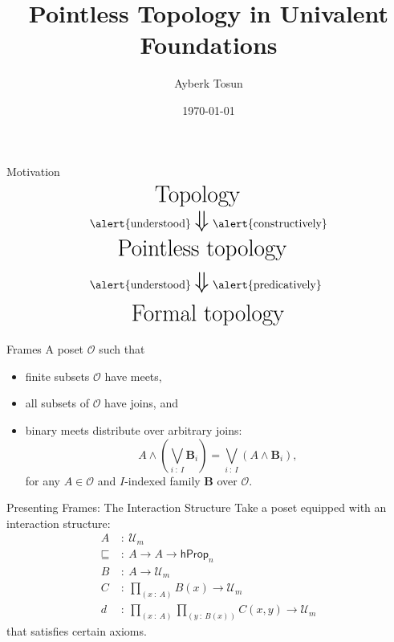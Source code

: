 \documentclass{beamer}
\title{Pointless Topology in Univalent Foundations}
\date{\today}
\author{Ayberk Tosun}
\institute{Chalmers University of Technology}
\newcommand{\pity}[3]{\prod_{(#1~:~#2)} #3}
\newcommand{\univ}{\mathcal{U}}
\begin{document}
\maketitle

\begin{frame}{Motivation}
  \begin{align*}
    \text{{\huge Top}}&\text{{\huge ology}}\\
    \text{\alert{understood}} &~\text{\huge $\Downarrow$}~\text{\alert{constructively}} \\
    \text{{\huge Pointles}}&\text{{\huge s~topology}}\\
    \text{\alert{understood}} &~\text{\huge $\Downarrow$}~\text{\alert{predicatively}} \\
    \text{{\huge Forma}}&\text{{\huge l~topology}}\\
  \end{align*}
\end{frame}

\begin{frame}{Frames}
  A poset $\mathcal{O}$ such that
  \begin{itemize}
    \item \alert{finite subsets} $\mathcal{O}$ have \alert{meets},
    \item \alert{all subsets} of $\mathcal{O}$ have \alert{joins}, and
    \item binary meets distribute over arbitrary joins:
      \begin{equation*}
        A \wedge \left( \bigvee_{i~:~I} \mathbf{B}_i \right) = \bigvee_{i~:~I} \left( A \wedge \mathbf{B}_i \right),
      \end{equation*}
      for any $A \in \mathcal{O}$ and $I$-indexed family $\mathbf{B}$ over $\mathcal{O}$.
  \end{itemize}
\end{frame}

\begin{frame}{Presenting Frames: The Interaction Structure}
  Take a poset equipped with an \alert{interaction structure}:
  \begin{align*}
    A ~&:~ \univ{}_m \\
    \sqsubseteq ~&:~ A \rightarrow A \rightarrow \mathsf{hProp}_n\\
    B ~&:~ A \rightarrow \univ{}_m\\
    C ~&:~ \pity{x}{A}{B(x) \rightarrow \univ{}_m}\\
    d ~&:~ \pity{x}{A}{\pity{y}{B(x)}{C(x, y) \rightarrow \univ{}_m}}
  \end{align*}
  that satisfies certain axioms.
\end{frame}
\end{document}
